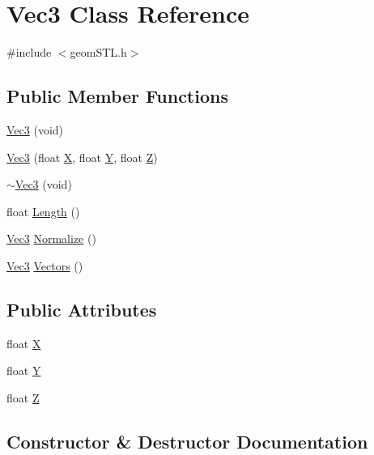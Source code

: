 \hypertarget{classVec3}{}\section{Vec3 Class Reference}
\label{classVec3}


{\ttfamily \#include $<$geom\+S\+T\+L.\+h$>$}

\subsection*{Public Member Functions}
\begin{DoxyCompactItemize}
\item 
\mbox{\hyperlink{classVec3_ae4fa47cbaeb9c461d2e7af43fd275db9}{Vec3}} (void)
\item 
\mbox{\hyperlink{classVec3_a770373275bb044b46c334330fa1fc18c}{Vec3}} (float \mbox{\hyperlink{classVec3_a11e316f7f9654c39dc0ae0843d58882a}{X}}, float \mbox{\hyperlink{classVec3_a5cb084577e40b5fb152dc2d375ff07f2}{Y}}, float \mbox{\hyperlink{classVec3_ae7177886a74ecc6b6bed33afa16f6336}{Z}})
\item 
\mbox{\hyperlink{classVec3_a16cba9bda14d7bae1b0eb6509cf88315}{$\sim$\+Vec3}} (void)
\item 
float \mbox{\hyperlink{classVec3_ad4cf0bf3253bcd53454291cc313b8c7b}{Length}} ()
\item 
\mbox{\hyperlink{classVec3}{Vec3}} \mbox{\hyperlink{classVec3_a0d4222dd154c6892c4d0f92e79a89eb8}{Normalize}} ()
\item 
\mbox{\hyperlink{classVec3}{Vec3}} \mbox{\hyperlink{classVec3_a60aba12a644625b125edc09955bb335c}{Vectors}} ()
\end{DoxyCompactItemize}
\subsection*{Public Attributes}
\begin{DoxyCompactItemize}
\item 
float \mbox{\hyperlink{classVec3_a11e316f7f9654c39dc0ae0843d58882a}{X}}
\item 
float \mbox{\hyperlink{classVec3_a5cb084577e40b5fb152dc2d375ff07f2}{Y}}
\item 
float \mbox{\hyperlink{classVec3_ae7177886a74ecc6b6bed33afa16f6336}{Z}}
\end{DoxyCompactItemize}


\subsection{Constructor \& Destructor Documentation}
\mbox{\label{classVec3_ae4fa47cbaeb9c461d2e7af43fd275db9}} 
